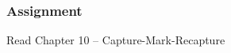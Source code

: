 \documentclass[color=usenames,dvipsnames]{beamer}\usepackage[]{graphicx}\usepackage[]{color}
\begin{document}




\begin{frame}
  \frametitle{Assignment}
  \Large
  \begin{center}
    Read Chapter 10 -- Capture-Mark-Recapture
  \end{center}
\end{frame}
\end{document}
